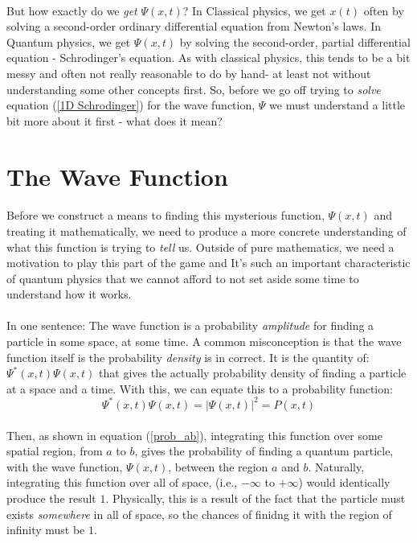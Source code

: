 \documentclass[12pt,letterpaper]{book}
\begin{document}
\paragraph*{}But how exactly do we \textit{get} $\Psi(x,t)$? In Classical physics, we get $x(t)$ often by solving a second-order ordinary differential equation from Newton's laws. In Quantum physics, we get $\Psi(x,t)$ by solving the second-order, partial differential equation - Schrodinger's equation. As with classical physics, this tends to be a bit messy and often not really reasonable to do by hand- at least not without understanding some other concepts first. So, before we go off trying to \textit{solve} equation (\ref{1D Schrodinger}) for the wave function, $\Psi$ we must understand a little bit more about it first - what does it mean?



\section{The Wave Function}

\paragraph*{}Before we construct a means to finding this mysterious function, $\Psi(x,t)$ and treating it mathematically, we need to produce a more concrete understanding of what this function is trying to \textit{tell} us. Outside of pure mathematics, we need a motivation to play this part of the game and It's such an important characteristic of quantum physics that we cannot afford to not set aside some time to understand how it works.
\paragraph*{}In one sentence: The wave function is a probability \textit{amplitude} for finding a particle in some space, at some time. A common misconception is that the wave function itself is the probability \textit{density} is in correct. It is the quantity of: $\Psi^*(x,t) \Psi(x,t)$ that gives the actually probability density of finding a particle at a space and a time. With this, we can equate this to a probability function:
\begin{equation}
\label{prob density func}
\Psi^*(x,t) \Psi(x,t) = \big | \Psi(x,t) \big|^2 = P(x,t)
\end{equation}
\paragraph*{}Then, as shown in equation (\ref{prob_ab}), integrating this function over some spatial region, from $a$ to $b$, gives the probability of finding a quantum particle, with the wave function, $\Psi(x,t)$, between the region $a$ and $b$. Naturally, integrating this function over all of space, (i.e., $-\infty$ to $+\infty$) would identically produce the result $1$. Physically, this is a result of the fact that the particle must exists \textit{somewhere} in all of space, so the chances of finidng it with the region of infinity must be $1$.
\end{document}
